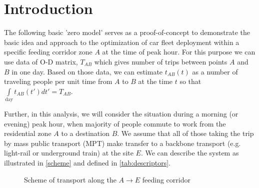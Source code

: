 \documentclass[a4paper]{report}
\newcommand\trip{$A\rightarrow{}E$}		%
\begin{document}
\section{Introduction}
The following basic 'zero model' serves as a proof-of-concept to demonstrate the basic idea and approach to the optimization of car fleet deployment within a specific feeding corridor zone $A$ at the time of peak hour. For this purpose we can use data of O-D matrix, $T_{AB}$ which gives number of trips between points $A$ and $B$ in one day. Based on those data, we can estimate $t_{AB}(t)$ as a number of traveling people per unit time from $A$ to $B$ at the time $t$ so that $\int\limits_{\text{day}} t_{AB}(t') dt' = T_{AB}$. 

Further, in this analysis, we will consider the situation during a morning (or evening) peak hour, when majority of people commute to work from the residential zone $A$ to a destination $B$. We assume that all of those taking the trip by mass public transport (MPT) make transfer to a backbone transport (e.g. light-rail or underground train) at the site $E$. We can describe the system as illustrated in \autoref{scheme} and defined in \autoref{tab:descriptors}.

\begin{figure}[ht]
\centering
	\caption{Scheme of transport along the \trip{} feeding corridor}
	\label{scheme}
\end{figure}
\end{document}
